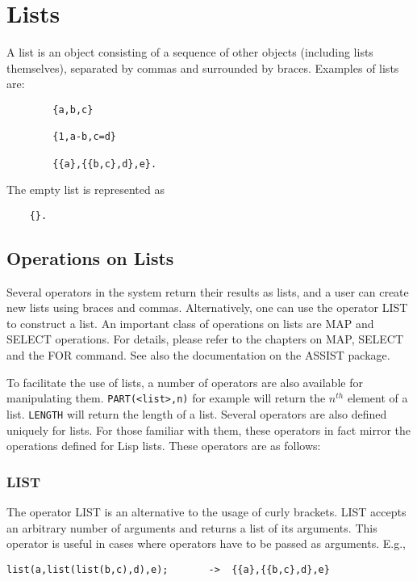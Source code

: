 \chapter{Lists}

A list is an object consisting of a sequence of other objects
(including lists themselves), separated by commas and surrounded by
braces.  Examples of lists are:
\begin{verbatim}
        {a,b,c}

        {1,a-b,c=d}

        {{a},{{b,c},d},e}.
\end{verbatim}
The empty list is represented as
\begin{verbatim}
	{}.
\end{verbatim}

\section{Operations on Lists}

Several operators in the system return their results as lists, and a user
can create new lists using braces and commas.  Alternatively, one can use
the operator LIST to construct a list.  An important class of operations
on lists are MAP and SELECT operations.  For details, please refer to the
chapters on MAP, SELECT and the FOR command.  See also the documentation
on the ASSIST package.

To facilitate the use of
lists, a number of operators are also available for manipulating
them. {\tt PART(<list>,n)} for example will return the
$n^{th}$ element of a list. {\tt LENGTH} will return the
length of a list.  Several operators are also defined uniquely for lists.
For those familiar with them, these operators in fact mirror the
operations defined for Lisp lists.  These operators are as follows:

\subsection{LIST}

The operator LIST is an alternative to the usage of curly brackets. LIST
accepts an arbitrary number of arguments and returns a list
of its arguments. This operator is useful in cases where operators
have to be passed as arguments. E.g.,
\begin{verbatim}
list(a,list(list(b,c),d),e);       ->  {{a},{{b,c},d},e}
\end{verbatim}

